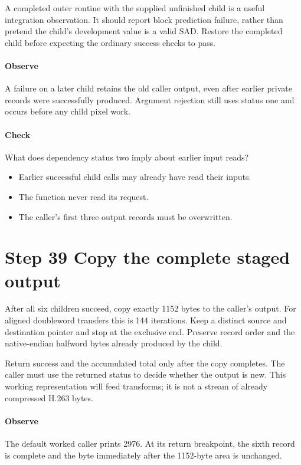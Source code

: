 A completed outer routine with the supplied unfinished child is a useful
integration observation. It should report block prediction failure, rather than
pretend the child's development value is a valid SAD. Restore the completed child
before expecting the ordinary success checks to pass.

\paragraph{Observe} A failure on a later child retains the old caller output,
even after earlier private records were successfully produced. Argument rejection
still uses status one and occurs before any child pixel work.
\paragraph{Check} What does dependency status two imply about earlier input reads?
\begin{itemize}
  \item[A.] Earlier successful child calls may already have read their inputs.
  \item[B.] The function never read its request.
  \item[C.] The caller's first three output records must be overwritten.
\end{itemize}

\section{Step 39 Copy the complete staged output}\label{h263-macroblock-s09}
After all six children succeed, copy exactly 1152 bytes to the caller's output.
For aligned doubleword transfers this is 144 iterations. Keep a distinct source
and destination pointer and stop at the exclusive end. Preserve record order and
the native-endian halfword bytes already produced by the child.

Return success and the accumulated total only after the copy completes. The
caller must use the returned status to decide whether the output is new. This
working representation will feed transforms; it is not a stream of already
compressed H.263 bytes.

\paragraph{Observe} The default worked caller prints 2976. At its return
breakpoint, the sixth record is complete and the byte immediately after the
1152-byte area is unchanged.
